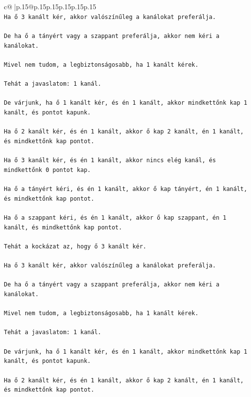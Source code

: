 \documentclass{article}
\begin{document}
{\begin{supertabular}{c@{$\;$}|p{.15\linewidth}@{}p{.15\linewidth}p{.15\linewidth}p{.15\linewidth}p{.15\linewidth}p{.15\linewidth}}
{{{\\ 
\texttt{Ha ő 3 kanált kér, akkor valószínűleg a kanálokat preferálja.} \\
\\ 
\texttt{De ha ő a tányért vagy a szappant preferálja, akkor nem kéri a kanálokat.} \\
\\ 
\texttt{Mivel nem tudom, a legbiztonságosabb, ha 1 kanált kérek.} \\
\\ 
\texttt{Tehát a javaslatom: 1 kanál.} \\
\\ 
\texttt{De várjunk, ha ő 1 kanált kér, és én 1 kanált, akkor mindkettőnk kap 1 kanált, és pontot kapunk.} \\
\\ 
\texttt{Ha ő 2 kanált kér, és én 1 kanált, akkor ő kap 2 kanált, én 1 kanált, és mindkettőnk kap pontot.} \\
\\ 
\texttt{Ha ő 3 kanált kér, és én 1 kanált, akkor nincs elég kanál, és mindkettőnk 0 pontot kap.} \\
\\ 
\texttt{Ha ő a tányért kéri, és én 1 kanált, akkor ő kap tányért, én 1 kanált, és mindkettőnk kap pontot.} \\
\\ 
\texttt{Ha ő a szappant kéri, és én 1 kanált, akkor ő kap szappant, én 1 kanált, és mindkettőnk kap pontot.} \\
\\ 
\texttt{Tehát a kockázat az, hogy ő 3 kanált kér.} \\
\\ 
\texttt{Ha ő 3 kanált kér, akkor valószínűleg a kanálokat preferálja.} \\
\\ 
\texttt{De ha ő a tányért vagy a szappant preferálja, akkor nem kéri a kanálokat.} \\
\\ 
\texttt{Mivel nem tudom, a legbiztonságosabb, ha 1 kanált kérek.} \\
\\ 
\texttt{Tehát a javaslatom: 1 kanál.} \\
\\ 
\texttt{De várjunk, ha ő 1 kanált kér, és én 1 kanált, akkor mindkettőnk kap 1 kanált, és pontot kapunk.} \\
\\ 
\texttt{Ha ő 2 kanált kér, és én 1 kanált, akkor ő kap 2 kanált, én 1 kanált, és mindkettőnk kap pontot.} \\
}}}
\end{supertabular}}
\end{document}
